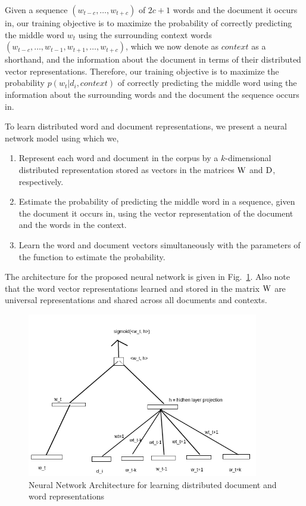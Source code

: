 Given a sequence $(w_{t-c}, \ldots, w_{t+c})$ of $2c+1$ words and the document it occurs in, our training objective is to maximize the probability of correctly predicting the middle word $w_{t}$ using the surrounding context words $(w_{t-c}, \ldots, w_{t-1}, w_{t+1}, \ldots, w_{t+c})$, which we now denote as $context$ as a shorthand, and the information about the document in terms of their distributed vector representations. 
Therefore, our training objective is to maximize the probability $p(w_{t} | d_{i}, context)$ of correctly predicting the middle word using the information about the surrounding words and the document the sequence occurs in. 

To learn distributed word and document representations, we present a neural network model using which we,
\begin{enumerate}
\item Represent each word and document in the corpus by a $k$-dimensional distributed representation stored as vectors in the matrices $\mathrm{W}$ and $\mathrm{D}$, respectively.
\item Estimate the probability of predicting the middle word in a sequence, given the document it occurs in, using the vector representation of the document and the words in the context.
\item Learn the word and document vectors simultaneously with the parameters of the function to estimate the probability.
\end{enumerate}
The architecture for the proposed neural network is given in Fig.~\ref{fig:nn:archi}.
Also note that the word vector representations learned and stored in the matrix $\mathrm{W}$ are universal representations and shared across all documents and contexts.
\begin{figure}[h!]
    \centering
        \includegraphics[width=0.9\textwidth]{figs/nn_arch.png}
    \caption{Neural Network Architecture for learning distributed document and word representations }
    \label{fig:nn:archi}
\end{figure}


